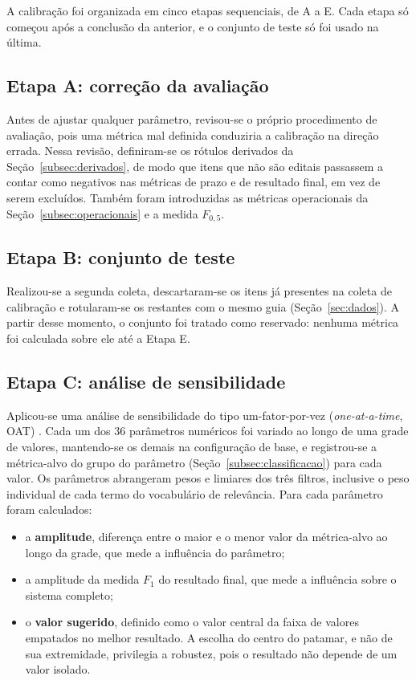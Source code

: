 A calibração foi organizada em cinco etapas sequenciais, de A a E. Cada etapa
só começou após a conclusão da anterior, e o conjunto de teste só foi usado na
última.

\subsection{Etapa A: correção da avaliação}
\label{subsec:etapaA}

Antes de ajustar qualquer parâmetro, revisou-se o próprio procedimento de
avaliação, pois uma métrica mal definida conduziria a calibração na direção
errada. Nessa revisão, definiram-se os rótulos derivados da
Seção~\ref{subsec:derivados}, de modo que itens que não são editais passassem a
contar como negativos nas métricas de prazo e de resultado final, em vez de
serem excluídos. Também foram introduzidas as métricas operacionais da
Seção~\ref{subsec:operacionais} e a medida $F_{0{,}5}$.

\subsection{Etapa B: conjunto de teste}
\label{subsec:etapaB}

Realizou-se a segunda coleta, descartaram-se os itens já presentes na coleta
de calibração e rotularam-se os restantes com o mesmo guia
(Seção~\ref{sec:dados}). A partir desse momento, o conjunto foi tratado como
reservado: nenhuma métrica foi calculada sobre ele até a Etapa E.

\subsection{Etapa C: análise de sensibilidade}
\label{subsec:etapaC}

Aplicou-se uma análise de sensibilidade do tipo um-fator-por-vez
(\textit{one-at-a-time}, OAT) \cite{saltelli2008}. Cada um dos 36 parâmetros
numéricos foi variado ao longo de uma grade de valores, mantendo-se os demais
na configuração de base, e registrou-se a métrica-alvo do grupo do parâmetro
(Seção~\ref{subsec:classificacao}) para cada valor. Os parâmetros abrangeram
pesos e limiares dos três filtros, inclusive o peso individual de cada termo do
vocabulário de relevância. Para cada parâmetro foram calculados:

\begin{itemize}
  \item a \textbf{amplitude}, diferença entre o maior e o menor valor da
    métrica-alvo ao longo da grade, que mede a influência do parâmetro;
  \item a amplitude da medida $F_1$ do resultado final, que mede a influência
    sobre o sistema completo;
  \item o \textbf{valor sugerido}, definido como o valor central da faixa de
    valores empatados no melhor resultado. A escolha do centro do patamar, e não
    de sua extremidade, privilegia a robustez, pois o resultado não depende de
    um valor isolado.
\end{itemize}

